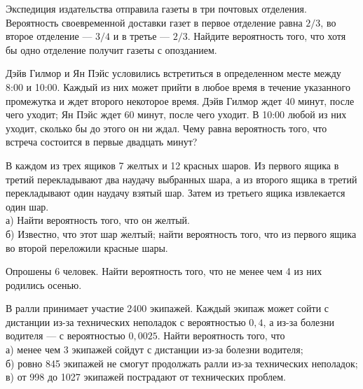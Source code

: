 \newpage\setcounter{zad}{0}



\begin{zkrW}{20}\noindent 
	Экспедиция издательства отправила газеты в три почтовых отделения. Вероятность своевременной доставки газет в первое отделение равна $2/3$, во второе отделение --- $3/4$ и в третье --- $2/3$. Найдите вероятность того, что хотя бы одно отделение получит газеты с опозданием.
 
\end{zkrW}

\begin{zkrW}{20}\noindent 
	Дэйв Гилмор и Ян Пэйс условились встретиться в определенном месте между 8:00 и 10:00. Каждый из них может прийти в любое время в течение указанного промежутка и ждет второго некоторое время. Дэйв Гилмор ждет 40 минут, после чего уходит; Ян Пэйс ждет 60 минут, после чего уходит. В 10:00 любой из них уходит, сколько бы до этого он ни ждал. Чему равна вероятность того, что встреча состоится в первые двадцать минут?
 
\end{zkrW}

\begin{zkrW}{20}\noindent 
	В каждом из трех ящиков 7 желтых и 12 красных шаров. Из первого ящика в третий перекладывают два наудачу выбранных шара, а из второго ящика в третий перекладывают один наудачу взятый шар. Затем из третьего ящика извлекается один шар. \\ \indent а) Найти вероятность того, что он желтый. \\ \indent б) Известно, что этот шар желтый; найти вероятность того, что из первого ящика во второй переложили красные шары.
 
\end{zkrW}

\begin{zkrW}{20}\noindent 
	Опрошены 6 человек. Найти вероятность того, что не менее чем 4 из них родились осенью.
 
\end{zkrW}

\begin{zkrW}{20}\noindent 
	В ралли принимает участие 2400 экипажей. Каждый экипаж может сойти с дистанции из-за технических неполадок с вероятностью $0{,}4$, а из-за болезни водителя --- с вероятностью $0{,}0025$. Найти вероятность того, что \\ \indent а) менее чем 3 экипажей сойдут с дистанции из-за болезни водителя; \\ \indent б) ровно 845 экипажей не смогут продолжать ралли из-за технических неполадок; \\ \indent в) от 998 до 1027 экипажей пострадают от технических проблем.
 
\end{zkrW}

